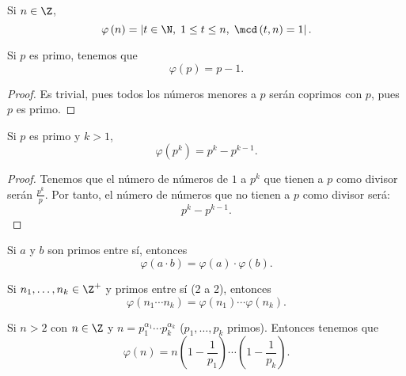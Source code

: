 \begin{fdefinition}
\normalfont Si $\displaystyle n\in \Z $, 
\[\varphi\left(n\right) = \left|t \in \N, \; 1 \leq t \leq n, \; \mcd\left(t,n\right) = 1\right| .\]
\end{fdefinition}

\begin{fprop}[]
\normalfont Si $\displaystyle p $ es primo, tenemos que 
\[\varphi\left(p\right) = p-1 .\]
\end{fprop}
\begin{proof}
Es trivial, pues todos los números menores a $\displaystyle p $ serán coprimos con $\displaystyle p $, pues $\displaystyle p $ es primo. 
\end{proof}

\begin{fprop}[]
\normalfont Si $\displaystyle p $ es primo y $\displaystyle k > 1 $, 
\[\varphi\left(p^{k}\right) = p^{k}-p^{k-1} .\]
\end{fprop}
\begin{proof}
Tenemos que el número de números de $\displaystyle 1 $  a $\displaystyle p^{k} $ que tienen a $\displaystyle p $ como divisor serán $\displaystyle \frac{p^{k}}{p} $. Por tanto, el número de números que no tienen a $\displaystyle p $ como divisor será:
\[p^{k} - p^{k-1} .\]
\end{proof}

\begin{ftheorem}[]
\normalfont Si $\displaystyle a $ y $\displaystyle b $ son primos entre sí, entonces
\[\varphi\left(a \cdot b\right) = \varphi\left(a\right) \cdot \varphi\left(b\right) .\]
\end{ftheorem}

\begin{fcolorary}[]
\normalfont Si $\displaystyle n_{1}, \ldots, n_{k} \in \Z^{+} $ y primos entre sí (2 a 2), entonces
\[\varphi\left(n_{1} \cdots n_{k}\right) = \varphi\left(n_{1}\right) \cdots \varphi\left(n_{k}\right) .\]
\end{fcolorary}

\begin{fcolorary}[]
\normalfont Si $\displaystyle n > 2 $ con $\displaystyle n \in \Z $ y $\displaystyle n = p_{1}^{\alpha_{1}}\cdots p_{k}^{\alpha_{k}} $ ($\displaystyle p_{1}, \ldots, p_{k}  $ primos). Entonces tenemos que
\[\varphi\left(n\right) = n\left(1 - \frac{1}{p_{1}}\right) \cdots \left(1 -\frac{1}{p_{k}}\right) .\]
\end{fcolorary}

